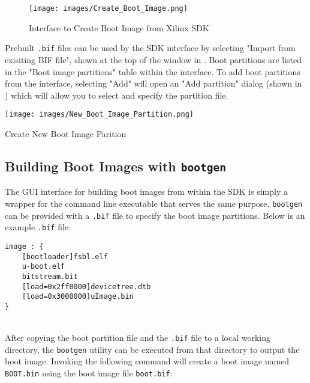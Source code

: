 \begin{figure}
	\centering
	\texttt{[image: images/Create\_Boot\_Image.png]}
	\caption{Interface to Create Boot Image from Xilinx SDK}
	\label{fig:createbootimage}
\end{figure}

\noindent
Prebuilt \texttt{.bif} files can be used by the SDK interface by selecting "Import from exisiting BIF file", shown at the top of the window in . Boot partitions are listed in the "Boot image partitions" table within the interface. To add boot partitions from the interface, selecting "Add" will open an "Add partition" dialog (shown in ) which will allow you to select and specify the partition file. \\ 


\begin{marginfigure}
	\centering
	\texttt{[image: images/New\_Boot\_Image\_Partition.png]}
	\caption[Create New Boot Image Parition]{Create New Boot Image Parition}
	\label{fig:bootimagepartition}
\end{marginfigure}

\newpage

\subsection{Building Boot Images with \texttt{bootgen}}

The GUI interface for building boot images from within the SDK is simply a wrapper for the command line executable that serves the same purpose. \texttt{bootgen} can be provided with a \texttt{.bif} file to specify the boot image partitions. Below is an example \texttt{.bif} file: \\

\begin{lstlisting}[style=text]
image : {
    [bootloader]fsbl.elf
    u-boot.elf
    bitstream.bit
    [load=0x2ff0000]devicetree.dtb
    [load=0x3000000]uImage.bin
}
\end{lstlisting}

~\\
\noindent
After copying the boot partition file and the \texttt{.bif} file to a local working directory, the \texttt{bootgen} utility can be executed from that directory to output the boot image. Invoking the following command will create a boot image named \texttt{BOOT.bin} using the boot image file \texttt{boot.bif}: \\

